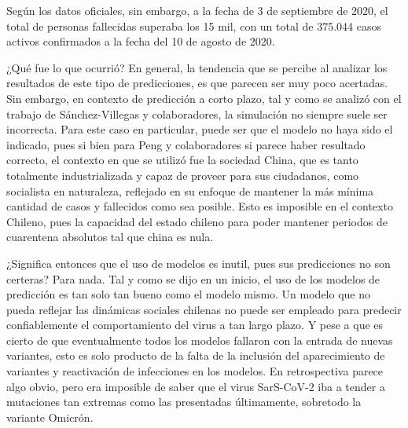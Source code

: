 Según los datos oficiales, sin embargo, a la fecha de 3 de septiembre de 2020, el total de personas fallecidas superaba los 15 mil, con un total de 375.044 casos activos confirmados a la fecha del 10 de agosto de 2020.

¿Qué fue lo que ocurrió? En general, la tendencia que se percibe al analizar los resultados de este tipo de predicciones, es que parecen ser muy poco acertadas. Sin embargo, en contexto de predicción a corto plazo, tal y como se analizó con el trabajo de Sánchez-Villegas y colaboradores, la simulación no siempre suele ser incorrecta. Para este caso en particular, puede ser que el modelo no haya sido el indicado, pues si bien para Peng y colaboradores si parece haber resultado correcto, el contexto en que se utilizó fue la sociedad China, que es tanto totalmente industrializada y capaz de proveer para sus ciudadanos, como socialista en naturaleza, reflejado en su enfoque de mantener la más mínima cantidad de casos y fallecidos como sea posible. Esto es imposible en el contexto Chileno, pues la capacidad del estado chileno para poder mantener periodos de cuarentena absolutos tal que china es nula.

¿Significa entonces que el uso de modelos es inutil, pues sus predicciones no son certeras? Para nada. Tal y como se dijo en un inicio, el uso de los modelos de predicción es tan solo tan bueno como el modelo mismo. Un modelo que no pueda reflejar las dinámicas sociales chilenas no puede ser empleado para predecir confiablemente el comportamiento del virus a tan largo plazo. Y pese a que es cierto de que eventualmente todos los modelos fallaron con la entrada de nuevas variantes, esto es solo producto de la falta de la inclusión del aparecimiento de variantes y reactivación de infecciones en los modelos. En retrospectiva parece algo obvio, pero era imposible de saber que el virus SarS-CoV-2 iba a tender a mutaciones tan extremas como las presentadas últimamente, sobretodo la variante Omicrón.
